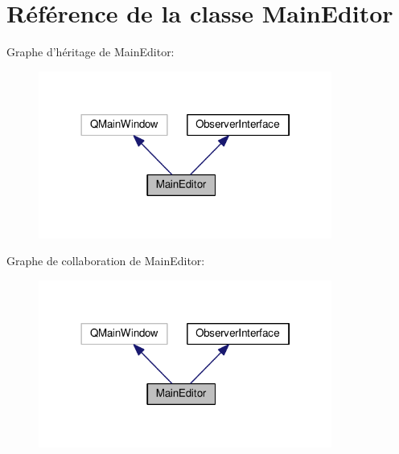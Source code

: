 \hypertarget{classMainEditor}{\section{Référence de la classe Main\+Editor}
\label{classMainEditor}
}


Graphe d'héritage de Main\+Editor\+:
\nopagebreak
\begin{figure}[H]
\begin{center}
\leavevmode
\includegraphics[width=273pt]{d1/d27/classMainEditor__inherit__graph}
\end{center}
\end{figure}


Graphe de collaboration de Main\+Editor\+:
\nopagebreak
\begin{figure}[H]
\begin{center}
\leavevmode
\includegraphics[width=273pt]{db/d11/classMainEditor__coll__graph}
\end{center}
\end{figure}
